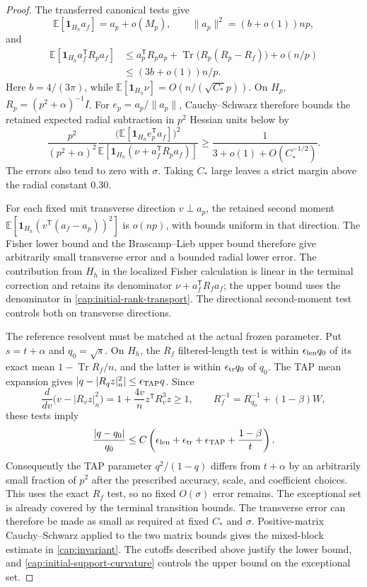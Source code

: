 \begin{proof}
The transferred canonical tests give
\[
 \mathbb E[\mathbf1_{H_h}a_f]=a_p+o(M_p),\qquad
 \|a_p\|^2=(b+o(1))np,
\]
and
\[
 \begin{split}
 \mathbb E[\mathbf1_{H_h}a_f^{\mathsf T}R_pa_f]
 &\le a_p^{\mathsf T}R_pa_p+
       \operatorname{Tr}\bigl(R_p(R_p-R_f)\bigr)+o(n/p)\\
 &\le (3b+o(1))n/p.
 \end{split}
\]
Here $b=4/(3\pi)$, while
$\mathbb E[\mathbf1_{H_h}\nu]=O(n/(\sqrt{C_*}p))$.
On $H_p$, $R_p=(p^2+\alpha)^{-1}I$. For
$e_p=a_p/\|a_p\|$, Cauchy--Schwarz therefore bounds the retained expected
radial subtraction in $p^2$ Hessian units below by
\begin{equation}\label{cap:initial-radial-deficit}
 \frac{p^2}{(p^2+\alpha)^2}
 \frac{\bigl(\mathbb E[\mathbf1_{H_h}e_p^{\mathsf T}a_f]\bigr)^2}
      {\mathbb E[\mathbf1_{H_h}(\nu+a_f^{\mathsf T}R_pa_f)]}
 \ge \frac{1}{3+o(1)+O(C_*^{-1/2})}.
\end{equation}
The errors also tend to zero with $\sigma$. Taking $C_*$ large leaves a
strict margin above the radial constant $0.30$.

For each fixed unit transverse direction $v\perp a_p$, the retained second
moment $\mathbb E[\mathbf1_{H_h}(v^{\mathsf T}(a_f-a_p))^2]$ is $o(np)$,
with bounds uniform in that direction. The Fisher lower bound and the
Brascamp--Lieb upper bound therefore give arbitrarily small transverse error
and a bounded radial lower error. The contribution from $H_h$ in the localized
Fisher calculation is linear in the terminal correction and retains its denominator
$\nu+a_f^{\mathsf T}R_fa_f$; the upper bound uses the denominator in
\eqref{cap:initial-rank-transport}. The directional second-moment test
controls both on transverse directions.

The reference resolvent must be matched at the actual frozen parameter.
Put $s=t+\alpha$ and $q_0=\sqrt s$. On $H_h$, the
$R_f$ filtered-length test is within $\epsilon_{\rm len}q_0$ of its exact
mean $1-\operatorname{Tr}R_f/n$, and the latter is within
$\epsilon_{\rm tr}q_0$ of $q_0$. The TAP mean expansion gives
$|q-|R_qz|_n^2|\le\epsilon_{\rm TAP}q$. Since
\[
 \frac{d}{dv}\bigl(v-|R_vz|_n^2\bigr)
 =1+\frac{4v}{n}z^{\mathsf T}R_v^3z\ge1,
 \qquad
 R_f^{-1}=R_{q_0}^{-1}+(1-\beta)W,
\]
these tests imply
\[
 \frac{|q-q_0|}{q_0}
 \le C\left(\epsilon_{\rm len}+\epsilon_{\rm tr}
            +\epsilon_{\rm TAP}+\frac{1-\beta}{t}\right).
\]
Consequently the TAP parameter $q^2/(1-q)$ differs from $t+\alpha$ by
an arbitrarily small fraction of $p^2$ after the prescribed accuracy,
scale, and coefficient choices. This uses the exact $R_f$ test, so no fixed
$O(\sigma)$ error remains. The exceptional set is already covered by the
terminal transition bounds. The transverse error can therefore be made as
small as required at fixed $C_*$ and $\sigma$.
Positive-matrix Cauchy--Schwarz applied to the two matrix bounds gives the
mixed-block estimate in \eqref{cap:invariant}. The cutoffs described above
justify the lower bound, and \eqref{cap:initial-support-curvature} controls
the upper bound on the exceptional set.


\end{proof}
